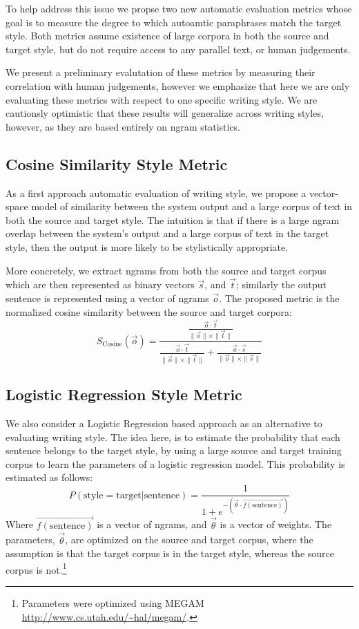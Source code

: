 \documentclass[10pt,a5paper,twoside]{article}
\begin{document}
To help address this issue we propse two new automatic evaluation metrics whose goal is to measure the degree to which
autoamtic paraphrases match the target style.  Both metrics assume existence of large corpora in both the source and
target style, but do not require access to any parallel text, or human judgements.

We present a preliminary evalutation of these metrics by measuring their correlation with human judgements, however
we emphasize that here we are only evaluating these metrics with respect to one specific writing style.  We
are cautionsly optimistic that these results will generalize across writing styles, however, as they are based entirely
on ngram statistics.

\subsection{Cosine Similarity Style Metric}
As a first approach automatic evaluation of writing style, we propose a vector-space model of similarity between the system
output and a large corpus of text in both the source and target style.  The intuition is that if there is a large ngram
overlap between the system's output and a large corpus of text in the target style, then the output is more likely to be
stylistically appropriate.

More concretely, we extract ngrams from both the source and target corpus which are then represented as binary
vectors $\vec{s}$, and $\vec{t}$; similarly the output sentence is represented using a vector of
ngrams $\vec{o}$.  
The proposed metric is the normalized cosine similarity between the source and target corpora:
\[
S_{\text{Cosine}}(\vec{o}) = \frac{\frac{\vec{o} \cdot \vec{t}}{\|\vec{o}\| \times \|\vec{t}\|}}{\frac{\vec{o} \cdot \vec{t}}{\|\vec{o}\| \times \|\vec{t}\|} + \frac{\vec{o} \cdot \vec{s}}{\|\vec{o}\| \times \|\vec{s}\|}}
\]
 

\subsection{Logistic Regression Style Metric}
We also consider a Logistic Regression based approach as an alternative to evaluating writing style.  The idea here, is to estimate the probability that each
sentence belongs to the target style, by using a large source and target training corpus to learn the parameters of a logistic regression model.
This probability is estimated as follows:
\[
P(\text{style} = \text{target}|\text{sentence}) = \frac{1}{1 + e^{-\left( \vec{\theta} \cdot \vec{f(\text{sentence})} \right)}}
\]
Where $\vec{f(\text{sentence})}$ is a vector of ngrams, and $\vec{\theta}$ is a vector of weights.  
The parameters, $\vec{\theta}$, are optimized on the source and target corpus, where the assumption is that the target corpus
is in the target style, whereas the source corpus is not.\footnote{
  Parameters were optimized using MEGAM \url{http://www.cs.utah.edu/~hal/megam/}.
}
\end{document}
